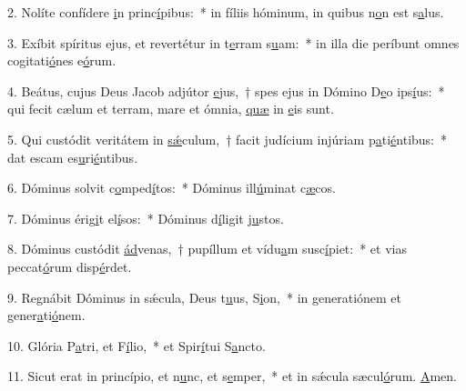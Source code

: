 2. Nolíte confídere \uline{i}n princ\uline{í}pibus:~* in fíliis hóminum, in quibus n\uline{o}n est s\uline{a}lus.\par 
3. Exíbit spíritus ejus, et revertétur in t\uline{e}rram s\uline{u}am:~* in illa die períbunt omnes cogitati\uline{ó}nes e\uline{ó}rum.\par 
4. Beátus, cujus Deus Jacob adjútor \uline{e}jus,~† spes ejus in Dómino D\uline{e}o ips\uline{í}us:~* qui fecit cælum et terram, mare et ómnia, \uline{quæ} in \uline{e}is sunt.\par 
5. Qui custódit veritátem in \uline{sǽ}culum,~† facit judícium injúriam p\uline{a}ti\uline{é}ntibus:~* dat escam es\uline{u}ri\uline{é}ntibus.\par 
6. Dóminus solvit c\uline{o}mped\uline{í}tos:~* Dóminus ill\uline{ú}minat c\uline{æ}cos.\par 
7. Dóminus érig\uline{i}t el\uline{í}sos:~* Dóminus d\uline{í}ligit j\uline{u}stos.\par 
8. Dóminus custódit \uline{ád}venas,~† pupíllum et vídu\uline{a}m susc\uline{í}piet:~* et vias peccat\uline{ó}rum disp\uline{é}rdet.\par 
9. Regnábit Dóminus in sǽcula, Deus t\uline{u}us, S\uline{i}on,~* in generatiónem et gener\uline{a}ti\uline{ó}nem.\par 
10. Glória P\uline{a}tri, et F\uline{í}lio,~* et Spir\uline{í}tui S\uline{a}ncto.\par 
11. Sicut erat in princípio, et n\uline{u}nc, et s\uline{e}mper,~* et in sǽcula sæcul\uline{ó}rum. \uline{A}men.\par 
